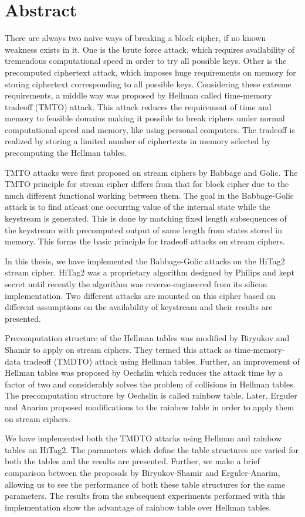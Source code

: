 

\chapter*{Abstract}

There are always two naive ways of breaking a block cipher, if no known weakness exists in it. One is the brute force attack, which requires availability of tremendous computational speed in order to try all possible keys. Other is the precomputed ciphertext attack, which imposes huge requirements on memory for storing ciphertext corresponding to all possible keys. Considering these extreme requirements, a middle way was proposed by Hellman called time-memory tradeoff (TMTO) attack. This attack reduces the requirement of time and memory to feasible domains making it possible to break ciphers under normal computational speed and memory, like using personal computers. The tradeoff is realized by storing a limited number of ciphertexts in memory selected by precomputing the Hellman tables.

TMTO attacks were first proposed on stream ciphers by Babbage and Golic. The TMTO principle for stream cipher differs from that for block cipher due to the much different functional working between them. The goal in the Babbage-Golic attack is to find atleast one occurring value of the internal state while the keystream is generated. This is done by matching fixed length subsequences of the keystream with precomputed output of same length from states stored in memory. This forms the basic principle for tradeoff attacks on stream ciphers. 

In this thesis, we have implemented the Babbage-Golic attacks on the HiTag2 stream cipher. HiTag2 was a proprietary algorithm designed by Philips and kept secret until recently the algorithm was reverse-engineered from its silicon implementation. Two different attacks are mounted on this cipher based on different assumptions on the availability of keystream and their results are presented. 

Precomputation structure of the Hellman tables was modified by Biryukov and Shamir to apply on stream ciphers. They termed this attack as time-memory-data tradeoff (TMDTO) attack using Hellman tables. Further, an improvement of Hellman tables was proposed by Oechslin which reduces the attack time by a factor of two and considerably solves the problem of collisions in Hellman tables. The precomputation structure by Oechslin is called rainbow table. Later, Erguler and Anarim proposed modifications to the rainbow table in order to apply them on stream ciphers.

We have implemented both the TMDTO attacks using Hellman and rainbow tables on HiTag2. The parameters which define the table structures are varied for both the tables and the results are presented. Further, we make a brief comparison between the proposals by Biryukov-Shamir and Erguler-Anarim, allowing us to see the performance of both these table structures for the same parameters. The results from the subsequent experiments performed with this implementation show the advantage of rainbow table over Hellman tables.